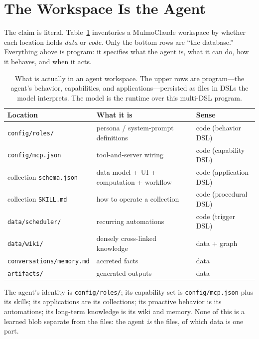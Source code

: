 \documentclass[11pt]{article}
\newcommand{\code}[1]{\texttt{\small #1}}
\begin{document}
\section{The Workspace Is the Agent}
\label{sec:workspace}

The claim is literal. Table~\ref{tab:contents} inventories a MulmoClaude workspace
by whether each location holds \emph{data} or \emph{code}. Only the bottom rows are
``the database.'' Everything above is program: it specifies what the agent is, what
it can do, how it behaves, and when it acts.

\begin{table}[t]
\centering
\small
\begin{tabular}{@{}lll@{}}
\toprule
\textbf{Location} & \textbf{What it is} & \textbf{Sense} \\
\midrule
\code{config/roles/}          & persona / system-prompt definitions   & code (behavior DSL) \\
\code{config/mcp.json}        & tool-and-server wiring                 & code (capability DSL) \\
collection \code{schema.json} & data model + UI + computation + workflow & code (application DSL) \\
collection \code{SKILL.md}    & how to operate a collection            & code (procedural DSL) \\
\code{data/scheduler/}        & recurring automations                  & code (trigger DSL) \\
\code{data/wiki/}             & densely cross-linked knowledge         & data + graph \\
\code{conversations/memory.md}& accreted facts                         & data \\
\code{artifacts/}             & generated outputs                      & data \\
\bottomrule
\end{tabular}
\caption{What is actually in an agent workspace. The upper rows are program---the
agent's behavior, capabilities, and applications---persisted as files in DSLs the
model interprets. The model is the runtime over this multi-DSL program.}
\label{tab:contents}
\end{table}

The agent's identity is \code{config/roles/}; its capability set is
\code{config/mcp.json} plus its skills; its applications are its collections; its
proactive behavior is its automations; its long-term knowledge is its wiki and
memory. None of this is a learned blob separate from the files: the agent
\emph{is} the files, of which data is one part.
\end{document}
